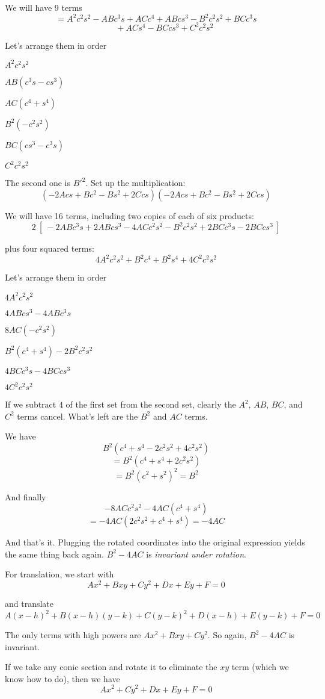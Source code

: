 \documentclass[11pt, oneside]{article}
\begin{document}
We will have 9 terms
\[ = A^2c^2s^2 - ABc^3s + ACc^4 + ABcs^3 - B^2c^2s^2 + BCc^3s \]
\[ \ \ \ \ \ \ \  \ \ + ACs^4 - BCcs^3 + C^2c^2s^2 \]

Let's arrange them in order

$A^2c^2s^2$

$AB(c^3s - cs^3)$

$AC(c^4 + s^4)$

$B^2(-c^2s^2)$

$BC(cs^3-c^3s)$

$C^2c^2s^2$

The second one is $B'^2$.  Set up the multiplication:
\[ (-2Acs + Bc^2 - Bs^2 + 2Ccs)(-2Acs + Bc^2 - Bs^2 + 2Ccs)  \]

We will have 16 terms, including two copies of each of six products:
\[ 2 \ [ \ - 2ABc^3s + 2ABcs^3 - 4ACc^2s^2 - B^2c^2s^2 + 2BCc^3s - 2BCcs^3 \ ] \]

plus  four squared terms:
\[ 4A^2c^2s^2 + B^2c^4 + B^2s^4 + 4C^2c^2s^2 \]

Let's arrange them in order

$4A^2c^2s^2$

$4ABcs^3 - 4ABc^3s$

$8AC(-c^2s^2)$

$B^2(c^4 + s^4) - 2B^2c^2s^2$

$4BCc^3s - 4BCcs^3$

$4C^2c^2s^2$

If we subtract $4$ of the first set from the second set, clearly the $A^2$, $AB$, $BC$, and $C^2$ terms cancel.  What's left are the $B^2$ and $AC$ terms.

We have
\[ B^2(c^4 + s^4 - 2c^2s^2 + 4c^2s^2) \]
\[ = B^2(c^4 + s^4 + 2c^2s^2) \]
\[ = B^2(c^2 + s^2)^2 = B^2 \]

And finally
\[ -8ACc^2s^2 - 4AC(c^4 + s^4) \]
\[ = -4AC(2c^2s^2 + c^4 + s^4) = -4AC \]

And that's it.  Plugging the rotated coordinates into the original expression yields the same thing back again.  $B^2 - 4AC$ is \emph{invariant under rotation}.

For translation, we start with
\[ Ax^2 + Bxy + Cy^2 + Dx + Ey + F = 0 \]

and translate
\[ A(x-h)^2 + B(x-h)(y-k) + C(y-k)^2 + D(x-h) + E(y-k) + F = 0 \]

The only terms with high powers are $Ax^2 + Bxy + Cy^2$.  So again, $B^2 - 4AC$ is invariant.

If we take any conic section and rotate it to eliminate the $xy$ term (which we know how to do), then we have
\[ Ax^2 + Cy^2 + Dx + Ey + F = 0 \]
\end{document}
